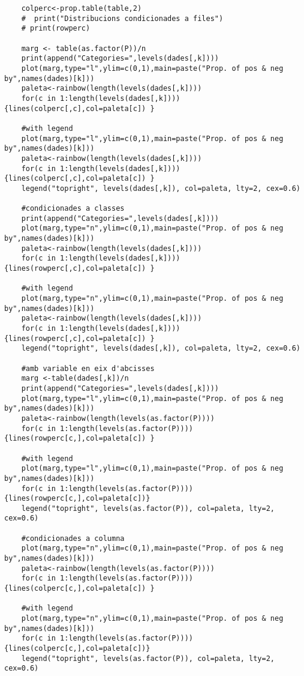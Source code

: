 \begin{verbatim}
    colperc<-prop.table(table,2)
    #  print("Distribucions condicionades a files")
    # print(rowperc)
    
    marg <- table(as.factor(P))/n
    print(append("Categories=",levels(dades[,k])))
    plot(marg,type="l",ylim=c(0,1),main=paste("Prop. of pos & neg by",names(dades)[k]))
    paleta<-rainbow(length(levels(dades[,k])))
    for(c in 1:length(levels(dades[,k]))){lines(colperc[,c],col=paleta[c]) }
    
    #with legend
    plot(marg,type="l",ylim=c(0,1),main=paste("Prop. of pos & neg by",names(dades)[k]))
    paleta<-rainbow(length(levels(dades[,k])))
    for(c in 1:length(levels(dades[,k]))){lines(colperc[,c],col=paleta[c]) }
    legend("topright", levels(dades[,k]), col=paleta, lty=2, cex=0.6)
    
    #condicionades a classes
    print(append("Categories=",levels(dades[,k])))
    plot(marg,type="n",ylim=c(0,1),main=paste("Prop. of pos & neg by",names(dades)[k]))
    paleta<-rainbow(length(levels(dades[,k])))
    for(c in 1:length(levels(dades[,k]))){lines(rowperc[,c],col=paleta[c]) }
    
    #with legend
    plot(marg,type="n",ylim=c(0,1),main=paste("Prop. of pos & neg by",names(dades)[k]))
    paleta<-rainbow(length(levels(dades[,k])))
    for(c in 1:length(levels(dades[,k]))){lines(rowperc[,c],col=paleta[c]) }
    legend("topright", levels(dades[,k]), col=paleta, lty=2, cex=0.6)
    
    #amb variable en eix d'abcisses
    marg <-table(dades[,k])/n
    print(append("Categories=",levels(dades[,k])))
    plot(marg,type="l",ylim=c(0,1),main=paste("Prop. of pos & neg by",names(dades)[k]))
    paleta<-rainbow(length(levels(as.factor(P))))
    for(c in 1:length(levels(as.factor(P)))){lines(rowperc[c,],col=paleta[c]) }
    
    #with legend
    plot(marg,type="l",ylim=c(0,1),main=paste("Prop. of pos & neg by",names(dades)[k]))
    for(c in 1:length(levels(as.factor(P)))){lines(rowperc[c,],col=paleta[c])}
    legend("topright", levels(as.factor(P)), col=paleta, lty=2, cex=0.6)
    
    #condicionades a columna 
    plot(marg,type="n",ylim=c(0,1),main=paste("Prop. of pos & neg by",names(dades)[k]))
    paleta<-rainbow(length(levels(as.factor(P))))
    for(c in 1:length(levels(as.factor(P)))){lines(colperc[c,],col=paleta[c]) }
    
    #with legend
    plot(marg,type="n",ylim=c(0,1),main=paste("Prop. of pos & neg by",names(dades)[k]))
    for(c in 1:length(levels(as.factor(P)))){lines(colperc[c,],col=paleta[c])}
    legend("topright", levels(as.factor(P)), col=paleta, lty=2, cex=0.6)
    

\end{verbatim}
